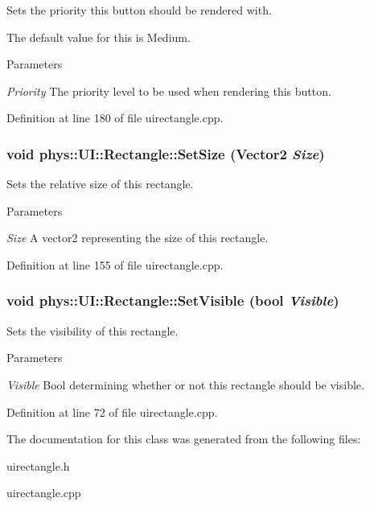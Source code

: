 Sets the priority this button should be rendered with. 

The default value for this is Medium. 
\begin{DoxyParams}{Parameters}
\item[{\em Priority}]The priority level to be used when rendering this button. \end{DoxyParams}


Definition at line 180 of file uirectangle.cpp.

\hypertarget{classphys_1_1UI_1_1Rectangle_ad199230240f116be24ddf7a85afc613f}{
\subsubsection[{SetSize}]{\setlength{\rightskip}{0pt plus 5cm}void phys::UI::Rectangle::SetSize ({\bf Vector2} {\em Size})}}
\label{d1/d5d/classphys_1_1UI_1_1Rectangle_ad199230240f116be24ddf7a85afc613f}


Sets the relative size of this rectangle. 


\begin{DoxyParams}{Parameters}
\item[{\em Size}]A vector2 representing the size of this rectangle. \end{DoxyParams}


Definition at line 155 of file uirectangle.cpp.

\hypertarget{classphys_1_1UI_1_1Rectangle_a4fa5021010e8cdaf9a9e35b3d4c82461}{
\subsubsection[{SetVisible}]{\setlength{\rightskip}{0pt plus 5cm}void phys::UI::Rectangle::SetVisible (bool {\em Visible})}}
\label{d1/d5d/classphys_1_1UI_1_1Rectangle_a4fa5021010e8cdaf9a9e35b3d4c82461}


Sets the visibility of this rectangle. 


\begin{DoxyParams}{Parameters}
\item[{\em Visible}]Bool determining whether or not this rectangle should be visible. \end{DoxyParams}


Definition at line 72 of file uirectangle.cpp.



The documentation for this class was generated from the following files:\begin{DoxyCompactItemize}
\item 
uirectangle.h\item 
uirectangle.cpp\end{DoxyCompactItemize}
